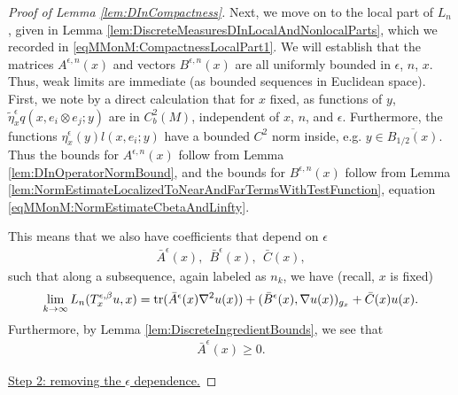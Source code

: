 \documentclass[11pt,reqno]{amsart}
\numberwithin{equation}{section}
\theoremstyle{plain}
\def\Tr{\textnormal{tr}}
\begin{document}
\begin{proof}[Proof of Lemma \ref{lem:DInCompactness}]
	Next, we move on to the local part of $L_n$, given in Lemma \ref{lem:DiscreteMeasuresDInLocalAndNonlocalParts}, which we recorded in \eqref{eqMMonM:CompactnessLocalPart1}.  We will establish that the matrices $A^{\epsilon,n}(x)$ and vectors $B^{\epsilon,n}(x)$ are all uniformly bounded in $\epsilon$, $n$, $x$.  Thus, weak limits are immediate (as bounded sequences in Euclidean space). First, we note by a direct calculation that for $x$ fixed, as functions of $y$, $\tilde\eta^\epsilon_x q(x,e_i\otimes e_j;y)$ are in $C^2_b(M)$, independent of $x$, $n$, and $\epsilon$.  Furthermore, the functions $\eta^\epsilon_x(y)l(x,e_i;y)$ have a bounded $C^2$ norm inside, e.g. $y\in \overline{B_{1/2}(x)}$.  Thus the bounds for $A^{\epsilon,n}(x)$ follow from Lemma \ref{lem:DInOperatorNormBound}, and the bounds for $B^{\epsilon,n}(x)$ follow from Lemma \ref{lem:NormEstimateLocalizedToNearAndFarTermsWithTestFunction}, equation \eqref{eqMMonM:NormEstimateCbetaAndLinfty}.
	
	This means that we also have coefficients that depend on $\epsilon$
	\begin{align*}
		\bar A^\epsilon(x),\ \ \bar B^\epsilon(x),\ \ \bar C(x),
	\end{align*}
	such that along a subsequence, again labeled as $n_k$, we have (recall, $x$ is fixed)
	\begin{align*}
		\lim_{k\to\infty} L_n(T^{\epsilon,\beta}_x u, x) = 
		 \Tr(\bar A^\epsilon(x)\nabla^2u(x))+(\bar B^\epsilon(x),\nabla u(x))_{g_x}+\bar C(x)u(x).
	\end{align*}
	Furthermore, by Lemma \ref{lem:DiscreteIngredientBounds}, we see that 
	\begin{align*}
		\bar A^\epsilon(x)\geq 0.
	\end{align*}
	
	
	
	\underline{Step 2:  removing the $\epsilon$ dependence.}
	

\end{proof}
\end{document}

